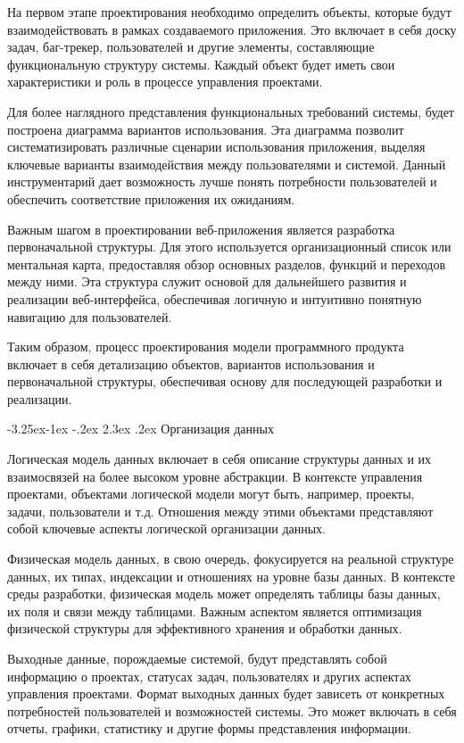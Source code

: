 \documentclass[a4paper,draft]{report}
\makeatletter
\renewcommand\subsection{\@startsection{subsection}{2}{\z@}%
  {-3.25ex\@plus -1ex \@minus -.2ex}%
  {2.3ex \@plus .2ex}%
  {\normalfont\indent\bfseries}}
\makeatother
\begin{document}
На первом этапе проектирования необходимо определить объекты, которые будут взаимодействовать в рамках создаваемого приложения.
Это включает в себя доску задач, баг-трекер, пользователей и другие элементы, составляющие функциональную структуру системы.
Каждый объект будет иметь свои характеристики и роль в процессе управления проектами.

Для более наглядного представления функциональных требований системы, будет построена диаграмма вариантов использования.
Эта диаграмма позволит систематизировать различные сценарии использования приложения, выделяя ключевые варианты взаимодействия между пользователями и системой.
Данный инструментарий дает возможность лучше понять потребности пользователей и обеспечить соответствие приложения их ожиданиям.

Важным шагом в проектировании веб-приложения является разработка первоначальной структуры.
Для этого используется организационный список или ментальная карта, предоставляя обзор основных разделов, функций и переходов между ними.
Эта структура служит основой для дальнейшего развития и реализации веб-интерфейса, обеспечивая логичную и интуитивно понятную навигацию для пользователей.

Таким образом, процесс проектирования модели программного продукта включает в себя детализацию объектов, вариантов использования и первоначальной структуры, обеспечивая основу для последующей разработки и реализации.

\subsection{Организация данных}

Логическая модель данных включает в себя описание структуры данных и их взаимосвязей на более высоком уровне абстракции.
В контексте управления проектами, объектами логической модели могут быть, например, проекты, задачи, пользователи и т.д.
Отношения между этими объектами представляют собой ключевые аспекты логической организации данных.

Физическая модель данных, в свою очередь, фокусируется на реальной структуре данных, их типах, индексации и отношениях на уровне базы данных.
В контексте среды разработки, физическая модель может определять таблицы базы данных, их поля и связи между таблицами. Важным аспектом является оптимизация физической структуры для эффективного хранения и обработки данных.

Выходные данные, порождаемые системой, будут представлять собой информацию о проектах, статусах задач, пользователях и других аспектах управления проектами.
Формат выходных данных будет зависеть от конкретных потребностей пользователей и возможностей системы. Это может включать в себя отчеты, графики, статистику и другие формы представления информации.
\end{document}
